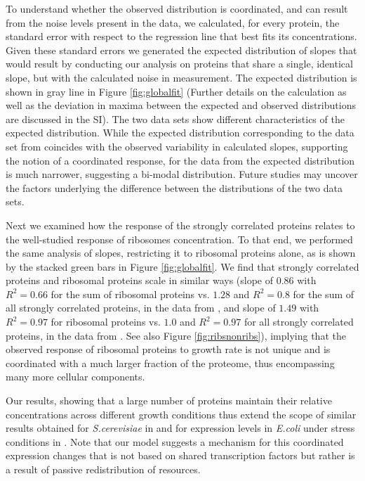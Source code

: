 \documentclass[a4paper]{article}
\newcommand{\hGlobalSumSlope}{$1.28$}
\newcommand{\hGlobalSumRsq}{0.8}
\newcommand{\hRibsSumSlope}{$0.86$}
\newcommand{\hRibsSumRsq}{0.66}
\newcommand{\vnGlobalSumSlope}{$1.0$}
\newcommand{\vGlobalSumSlope}{\vnGlobalSumSlope{}}
\newcommand{\vnGlobalSumRsq}{0.97}
\newcommand{\vGlobalSumRsq}{\vnGlobalSumRsq{}}
\newcommand{\vnRibsSumSlope}{$1.49$}
\newcommand{\vRibsSumSlope}{\vnRibsSumSlope{}}
\newcommand{\vnRibsSumRsq}{0.97}
\newcommand{\vRibsSumRsq}{\vnRibsSumRsq{}}
\begin{document}
To understand whether the observed distribution is coordinated, and can result from the noise levels present in the data, we calculated, for every protein, the standard error with respect to the regression line that best fits its concentrations.
Given these standard errors we generated the expected distribution of slopes that would result by conducting our analysis on proteins that share a single, identical slope, but with the calculated noise in measurement.
The expected distribution is shown in gray line in Figure \ref{fig:globalfit} (Further details on the calculation as well as the deviation in maxima between the expected and observed distributions are discussed in the SI).
The two data sets show different characteristics of the expected distribution.
While the expected distribution corresponding to the data set from \cite{Heinemann2015} coincides with the observed variability in calculated slopes, supporting the notion of a coordinated response, for the data from \cite{Peebo_2015} the expected distribution is much narrower, suggesting a bi-modal distribution.
Future studies may uncover the factors underlying the difference between the distributions of the two data sets.

Next we examined how the response of the strongly correlated proteins relates to the well-studied response of ribosomes concentration.
To that end, we performed the same analysis of slopes, restricting it to ribosomal proteins alone, as is shown by the stacked green bars in Figure \ref{fig:globalfit}.
We find that strongly correlated proteins and ribosomal proteins scale in similar ways (slope of \hRibsSumSlope{} with $R^2=\hRibsSumRsq{}$ for the sum of ribosomal proteins vs. \hGlobalSumSlope{} and $R^2=\hGlobalSumRsq$ for the sum of all strongly correlated proteins, in the data from \cite{Heinemann2015}, and slope of \vRibsSumSlope{} with $R^2=\vRibsSumRsq{}$ for ribosomal proteins vs. \vGlobalSumSlope{} and $R^2=\vGlobalSumRsq{}$ for all strongly correlated proteins, in the data from \cite{Peebo_2015}. See also Figure \ref{fig:ribsnonribs}), implying that the observed response of ribosomal proteins to growth rate is not unique and is coordinated with a much larger fraction of the proteome, thus encompassing many more cellular components.

Our results, showing that a large number of proteins maintain their relative concentrations across different growth conditions thus extend the scope of similar results obtained for \emph{S.cerevisiae} in \cite{Keren2013a} and for expression levels in \emph{E.coli} under stress conditions in \cite{Kaneko2014}.
Note that our model suggests a mechanism for this coordinated expression changes that is not based on shared transcription factors but rather is a result of passive redistribution of resources.
\end{document}

